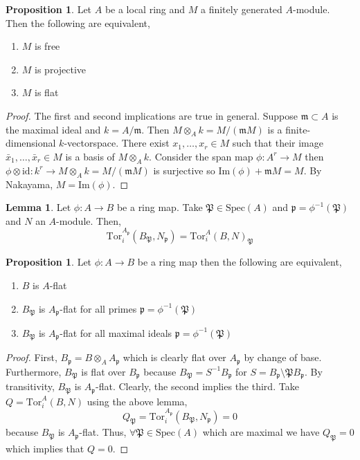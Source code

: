 \documentclass[12pt]{article}
\renewcommand{\Im}[1]{\mathrm{Im}(#1)}
\newcommand{\id}{\mathrm{id}}
\newcommand{\Tor}[4]{\mathrm{Tor}^{#1}_{#2} \left( #3, #4 \right)}
\newcommand{\spec}[1]{\mathrm{Spec}\left( #1 \right)}
\newcommand{\p}{\mathfrak{p}}
\newcommand{\m}{\mathfrak{m}}
\theoremstyle{remark}
\theoremstyle{definition}
\newtheorem{lemma}[theorem]{Lemma}
\newtheorem{proposition}[theorem]{Proposition}
\begin{document}
\begin{proposition}
Let $A$ be a local ring and $M$ a finitely generated $A$-module. Then the following are equivalent,
\begin{enumerate}
\item $M$ is free

\item $M$ is projective

\item $M$ is flat
\end{enumerate}
\end{proposition}

\begin{proof}
The first and second implications are true in general. Suppose $\m \subset A$ is the maximal ideal and $k = A / \m$. Then $M \otimes_A k = M / (\m M)$ is a finite-dimensional $k$-vectorspace. There exist $x_1, \dots, x_r \in M$ such that their image $\bar{x}_1, \dots, \bar{x}_r \in M$ is a basis of $M \otimes_A k$. Consider the  span map $\phi : A^r \to M$ then $\phi \otimes \id : k^r \to M \otimes_A k = M / (\m M)$ is surjective so $\Im{\phi} + \m M = M$. By Nakayama, $M = \Im{\phi}$.  
\end{proof}

\begin{lemma}
Let $\phi : A \to B$ be a ring map. Take $\mathfrak{P} \in \spec{A}$ and $\p = \phi^{-1}(\mathfrak{P})$ and $N$ an $A$-module. Then,
\[ \Tor{A_{\p}}{i}{B_{\mathfrak{P}}}{N_{\p}} = \Tor{A}{i}{B}{N}_{\mathfrak{P}} \]
\end{lemma}

\begin{proposition}
Let $\phi : A \to B$ be a ring map then the following are equivalent,
\begin{enumerate}
\item $B$ is $A$-flat
\item $B_{\mathfrak{P}}$ is $A_{\p}$-flat for all primes $\p = \phi^{-1}(\mathfrak{P})$
\item $B_{\mathfrak{P}}$ is $A_{\p}$-flat for all maximal ideals $\p = \phi^{-1}(\mathfrak{P})$
\end{enumerate}
\end{proposition}

\begin{proof}
First, $B_\p = B \otimes_A A_\p$ which is clearly flat over $A_\p$ by change of base. Furthermore, $B_{\mathfrak{P}}$ is flat over $B_\p$ because $B_{\mathfrak{P}} = S^{-1} B_\p$ for $S = B_\p \setminus \mathfrak{P} B_\p$. By transitivity, $B_{\mathfrak{P}}$ is $A_\p$-flat. Clearly, the second implies the third. Take $Q = \Tor{A}{i}{B}{N}$ using the above lemma,
\[ Q_{\mathfrak{P}} = \Tor{A_\p}{i}{B_{\mathfrak{P}}}{N_\p} = 0 \]
because $B_{\mathfrak{P}}$ is $A_\p$-flat. Thus, $\forall \mathfrak{P} \in \spec{A}$ which are maximal we have $Q_{\mathfrak{P}} = 0$ which implies that $Q = 0$. 
\end{proof}
\end{document}
